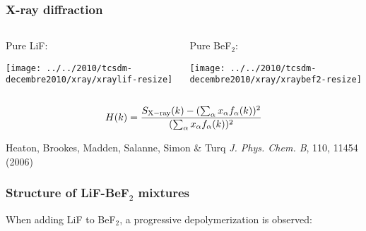 \documentclass{beamer}
\begin{document}
\begin{frame}
   \frametitle{X-ray diffraction}
   \begin{columns}
      \begin{column}{6.0cm}
      Pure LiF:
      \begin{center}
       \texttt{[image: ../../2010/tcsdm-decembre2010/xray/xraylif-resize]}
      \end{center}
      \end{column}
      \begin{column}{6.0cm}
      Pure BeF$_2$:
      \begin{center}
       \texttt{[image: ../../2010/tcsdm-decembre2010/xray/xraybef2-resize]}
      \end{center}
      \end{column}
   \end{columns}
   \begin{equation}
   H(k) = \frac{S_{\rm X-ray}(k)-(\sum_\alpha x_\alpha f_\alpha (k))^2}{(\sum_\alpha x_\alpha f_\alpha (k))^2} \nonumber
   \end{equation} 
   \vspace{0.5cm}  
   
   \scriptsize{Heaton, Brookes, Madden, Salanne, Simon \& Turq {\it J. Phys. Chem. B}, 110, 11454 (2006)}
\end{frame}



\begin{frame}
   \frametitle{Structure of LiF-BeF$_2$ mixtures}
   When adding LiF to BeF$_2$, a progressive depolymerization is observed:
\end{frame}
\end{document}
